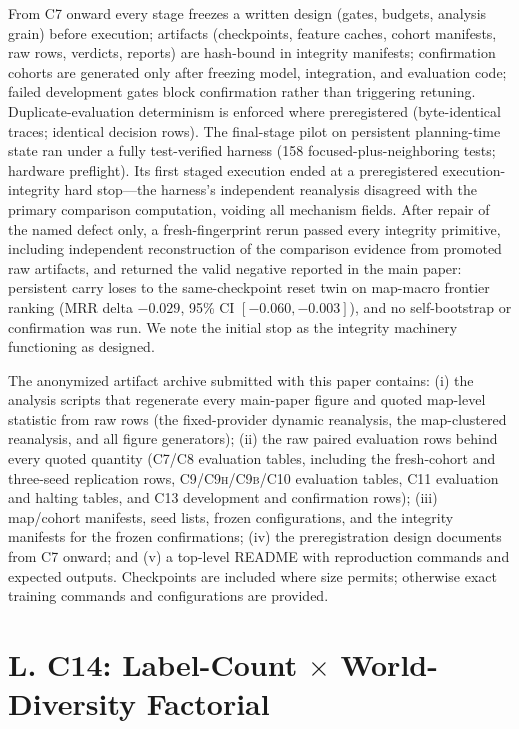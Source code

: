 \documentclass[letterpaper]{article} %
\newcommand{\stage}[1]{\textsc{#1}}
\begin{document}
From \stage{C7} onward every stage freezes a written design (gates, budgets, analysis grain) before execution; artifacts (checkpoints, feature caches, cohort manifests, raw rows, verdicts, reports) are hash-bound in integrity manifests; confirmation cohorts are generated only after freezing model, integration, and evaluation code; failed development gates block confirmation rather than triggering retuning. Duplicate-evaluation determinism is enforced where preregistered (byte-identical traces; identical decision rows). The final-stage pilot on persistent planning-time state ran under a fully test-verified harness (158 focused-plus-neighboring tests; hardware preflight). Its first staged execution ended at a preregistered execution-integrity hard stop---the harness's independent reanalysis disagreed with the primary comparison computation, voiding all mechanism fields. After repair of the named defect only, a fresh-fingerprint rerun passed every integrity primitive, including independent reconstruction of the comparison evidence from promoted raw artifacts, and returned the valid negative reported in the main paper: persistent carry loses to the same-checkpoint reset twin on map-macro frontier ranking (MRR delta $-0.029$, 95\% CI $[-0.060,-0.003]$), and no self-bootstrap or confirmation was run. We note the initial stop as the integrity machinery functioning as designed.

The anonymized artifact archive submitted with this paper contains: (i) the analysis scripts that regenerate every main-paper figure and quoted map-level statistic from raw rows (the fixed-provider dynamic reanalysis, the map-clustered reanalysis, and all figure generators); (ii) the raw paired evaluation rows behind every quoted quantity (\stage{C7}/\stage{C8} evaluation tables, including the fresh-cohort and three-seed replication rows, \stage{C9}/\stage{C9h}/\stage{C9b}/\stage{C10} evaluation tables, \stage{C11} evaluation and halting tables, and \stage{C13} development and confirmation rows); (iii) map/cohort manifests, seed lists, frozen configurations, and the integrity manifests for the frozen confirmations; (iv) the preregistration design documents from \stage{C7} onward; and (v) a top-level README with reproduction commands and expected outputs. Checkpoints are included where size permits; otherwise exact training commands and configurations are provided.

\section{L. C14: Label-Count $\times$ World-Diversity Factorial}
\end{document}
